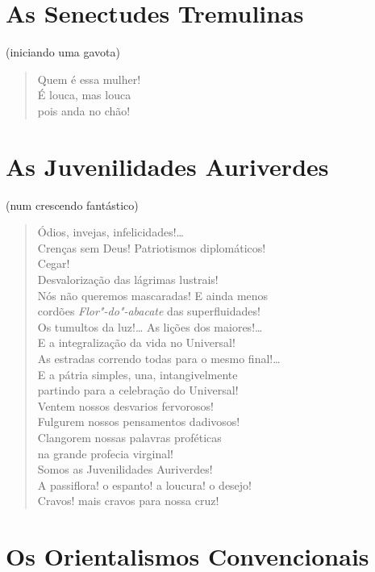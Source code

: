 \section*{As Senectudes Tremulinas}

\hfill{}(iniciando uma gavota)

\begin{verse}
Quem é essa mulher!\\
É louca, mas louca\\
pois anda no chão!
\end{verse}

\section*{As Juvenilidades Auriverdes}

\hfill{}(num crescendo fantástico)

\begin{verse}
Ódios, invejas, infelicidades!\ldots{}\\
Crenças sem Deus! Patriotismos diplomáticos!\\
Cegar!\\
Desvalorização das lágrimas lustrais!\\
Nós não queremos mascaradas! E ainda menos\\
cordões \emph{Flor"-do"-abacate} das superfluidades!\\
Os tumultos da luz!\ldots{} As lições dos maiores!\ldots{}\\
E a integralização da vida no Universal!\\
As estradas correndo todas para o mesmo final!\ldots{}\\
E a pátria simples, una, intangivelmente\\
partindo para a celebração do Universal!\\
Ventem nossos desvarios fervorosos!\\
Fulgurem nossos pensamentos dadivosos!\\
Clangorem nossas palavras proféticas\\
na grande profecia virginal!\\
Somos as Juvenilidades Auriverdes!\\
A passiflora! o espanto! a loucura! o desejo!\\
Cravos! mais cravos para nossa cruz!
\end{verse}

\section*{Os Orientalismos Convencionais}

